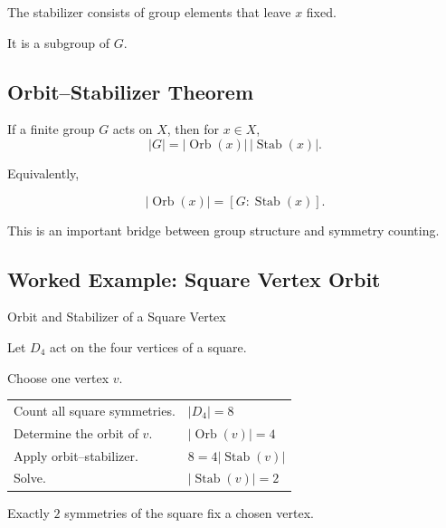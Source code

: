 The stabilizer consists of group elements that leave \(x\) fixed.

It is a subgroup of \(G\).

\subsection{Orbit--Stabilizer Theorem}
\label{subsec:orbit-stabilizer}

\begin{theorem}
If a finite group \(G\) acts on \(X\), then for \(x\in X\),
\[ |G|=|\operatorname{Orb}(x)|\,|\operatorname{Stab}(x)|. \]
\end{theorem}

Equivalently,

\[ |\operatorname{Orb}(x)|=[G:\operatorname{Stab}(x)]. \]

This is an important bridge between group structure and symmetry counting.

\subsection{Worked Example: Square Vertex Orbit}
\label{subsec:worked-square-orbit}

\begin{workedexamplebox}{Orbit and Stabilizer of a Square Vertex}

Let \(D_4\) act on the four vertices of a square.

Choose one vertex \(v\).

\begin{tabularx}{\textwidth}{@{}>{\raggedright\arraybackslash}p{}X@{}}
Count all square symmetries. & \(|D_4|=8\)\\
Determine the orbit of \(v\). & \(|\operatorname{Orb}(v)|=4\)\\
Apply orbit--stabilizer. & \(8=4|\operatorname{Stab}(v)|\)\\
Solve. & \(|\operatorname{Stab}(v)|=2\)
\end{tabularx}

\begin{answerbox}
Exactly \(2\) symmetries of the square fix a chosen vertex.
\end{answerbox}
\end{workedexamplebox}

